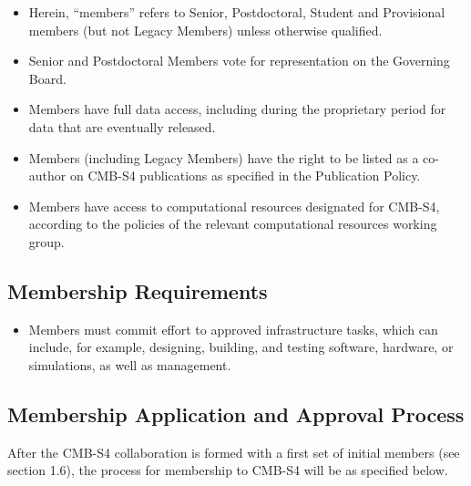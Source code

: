 \begin{itemize}
\item Herein, ``members'' refers to Senior, Postdoctoral, Student and Provisional members (but not Legacy Members) unless otherwise qualified.

\item Senior and Postdoctoral Members vote for representation on the Governing Board.  

\item Members have full data access, including during the proprietary period for data that are eventually released.

\item Members (including Legacy Members) have the right to be listed as a co-author on CMB-S4 publications as specified in the Publication Policy.

\item Members have access to computational resources designated for CMB-S4, according to the policies of the relevant computational resources working group.

\end{itemize}

\subsection{Membership Requirements}
\begin{itemize}

\item Members must commit effort to approved infrastructure tasks, which can include, for example, designing, building, and testing software, hardware, or simulations, as well as management. 


\end{itemize}

\subsection{Membership Application and Approval Process}
After the CMB-S4 collaboration is formed with a first set of initial members (see section 1.6), the process for membership to CMB-S4 will be as specified below.

